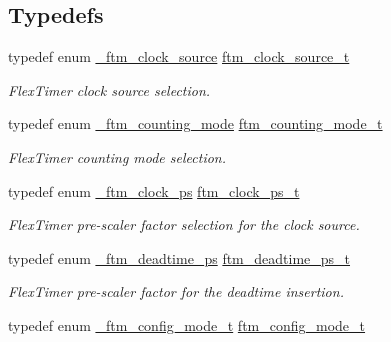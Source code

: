 \subsection*{Typedefs}
\begin{DoxyCompactItemize}
\item 
typedef enum \hyperlink{group__ftm__hal_ga1631aa75184432b61dce335e3ea19c82}{\+\_\+ftm\+\_\+clock\+\_\+source} \hyperlink{group__ftm__hal_ga3b49a5fd637d7fcafa8141e143df4220}{ftm\+\_\+clock\+\_\+source\+\_\+t}\hypertarget{group__ftm__hal_ga3b49a5fd637d7fcafa8141e143df4220}{}\label{group__ftm__hal_ga3b49a5fd637d7fcafa8141e143df4220}

\begin{DoxyCompactList}\small\item\em Flex\+Timer clock source selection. \end{DoxyCompactList}\item 
typedef enum \hyperlink{group__ftm__hal_ga5c364e9561194510179ee19d0988a45f}{\+\_\+ftm\+\_\+counting\+\_\+mode} \hyperlink{group__ftm__hal_gacd9f6e0046c425c04578e3dc1256737c}{ftm\+\_\+counting\+\_\+mode\+\_\+t}\hypertarget{group__ftm__hal_gacd9f6e0046c425c04578e3dc1256737c}{}\label{group__ftm__hal_gacd9f6e0046c425c04578e3dc1256737c}

\begin{DoxyCompactList}\small\item\em Flex\+Timer counting mode selection. \end{DoxyCompactList}\item 
typedef enum \hyperlink{group__ftm__hal_gaf2d69ea78d9db386313850f9ab25e30a}{\+\_\+ftm\+\_\+clock\+\_\+ps} \hyperlink{group__ftm__hal_gaf655a5a42ea121a924ac642f23621577}{ftm\+\_\+clock\+\_\+ps\+\_\+t}\hypertarget{group__ftm__hal_gaf655a5a42ea121a924ac642f23621577}{}\label{group__ftm__hal_gaf655a5a42ea121a924ac642f23621577}

\begin{DoxyCompactList}\small\item\em Flex\+Timer pre-\/scaler factor selection for the clock source. \end{DoxyCompactList}\item 
typedef enum \hyperlink{group__ftm__hal_gad9f0fd5973baa099b25d10bf325c572d}{\+\_\+ftm\+\_\+deadtime\+\_\+ps} \hyperlink{group__ftm__hal_ga161838c2358121aacc4778c250fd2efe}{ftm\+\_\+deadtime\+\_\+ps\+\_\+t}\hypertarget{group__ftm__hal_ga161838c2358121aacc4778c250fd2efe}{}\label{group__ftm__hal_ga161838c2358121aacc4778c250fd2efe}

\begin{DoxyCompactList}\small\item\em Flex\+Timer pre-\/scaler factor for the deadtime insertion. \end{DoxyCompactList}\item 
typedef enum \hyperlink{group__ftm__hal_ga28d1183ea739cf9ce4983d04677ce6a5}{\+\_\+ftm\+\_\+config\+\_\+mode\+\_\+t} \hyperlink{group__ftm__hal_gac70fc66eaed6c7863ae8f9c632bac77a}{ftm\+\_\+config\+\_\+mode\+\_\+t}\hypertarget{group__ftm__hal_gac70fc66eaed6c7863ae8f9c632bac77a}{}\label{group__ftm__hal_gac70fc66eaed6c7863ae8f9c632bac77a}


\end{DoxyCompactItemize}
